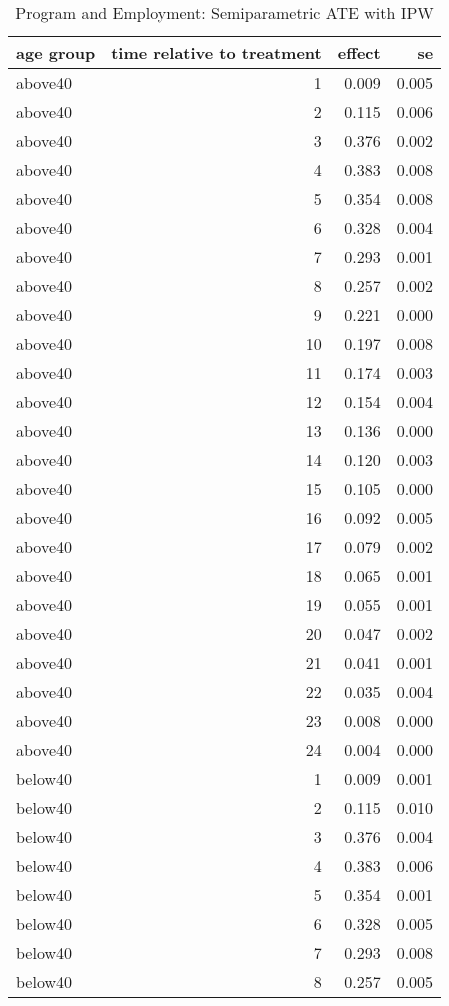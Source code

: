 \begin{table}[!h]
\tiny
\centering
\caption{Program and Employment: Semiparametric ATE with IPW}
\centering
\begin{tabular}[t]{lrrr}
\toprule
age group & time relative to treatment & effect & se\\
\midrule
above40 & 1 & 0.009 & 0.005\\
above40 & 2 & 0.115 & 0.006\\
above40 & 3 & 0.376 & 0.002\\
above40 & 4 & 0.383 & 0.008\\
above40 & 5 & 0.354 & 0.008\\
\addlinespace
above40 & 6 & 0.328 & 0.004\\
above40 & 7 & 0.293 & 0.001\\
above40 & 8 & 0.257 & 0.002\\
above40 & 9 & 0.221 & 0.000\\
above40 & 10 & 0.197 & 0.008\\
\addlinespace
above40 & 11 & 0.174 & 0.003\\
above40 & 12 & 0.154 & 0.004\\
above40 & 13 & 0.136 & 0.000\\
above40 & 14 & 0.120 & 0.003\\
above40 & 15 & 0.105 & 0.000\\
\addlinespace
above40 & 16 & 0.092 & 0.005\\
above40 & 17 & 0.079 & 0.002\\
above40 & 18 & 0.065 & 0.001\\
above40 & 19 & 0.055 & 0.001\\
above40 & 20 & 0.047 & 0.002\\
\addlinespace
above40 & 21 & 0.041 & 0.001\\
above40 & 22 & 0.035 & 0.004\\
above40 & 23 & 0.008 & 0.000\\
above40 & 24 & 0.004 & 0.000\\
below40 & 1 & 0.009 & 0.001\\
\addlinespace
below40 & 2 & 0.115 & 0.010\\
below40 & 3 & 0.376 & 0.004\\
below40 & 4 & 0.383 & 0.006\\
below40 & 5 & 0.354 & 0.001\\
below40 & 6 & 0.328 & 0.005\\
\addlinespace
below40 & 7 & 0.293 & 0.008\\
below40 & 8 & 0.257 & 0.005\\

\end{tabular}
\end{table}
